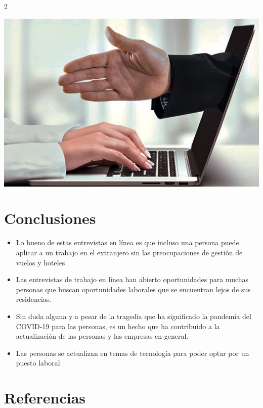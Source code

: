 \documentclass[12pt,spanish,Letterpaper,openany]{book}
\providecommand{\tightlist}{%
  \setlength{\itemsep}{0pt}\setlength{\parskip}{0pt}}
\begin{document}
\begin {multicols}{2}
\begin {flushleft}
\begin{minipage}[c]{\columnwidth}
\includegraphics[width=1\linewidth]{images/pareja36_image3}

\end{minipage}
\end {flushleft}

\hypertarget{conclusiones-6}{%
\section{Conclusiones}\label{conclusiones-6}}

\begin{itemize}
\tightlist
\item
  Lo bueno de estas entrevistas en línea es que incluso una persona puede aplicar a un trabajo en el extranjero sin las preocupaciones de gestión de vuelos y hoteles
\item
  Las entrevistas de trabajo en línea han abierto oportunidades para muchas personas que buscan oportunidades laborales que se encuentran lejos de sus residencias.
\item
  Sin duda alguna y a pesar de la tragedia que ha significado la pandemia del COVID-19 para las personas, es un hecho que ha contribuido a la actualización de las personas y las empresas en general.
\item
  Las personas se actualizan en temas de tecnología para poder optar por un puesto laboral
\end{itemize}

\hypertarget{referencias-10}{%
\section{Referencias}\label{referencias-10}}


\end{multicols}
\end{document}
